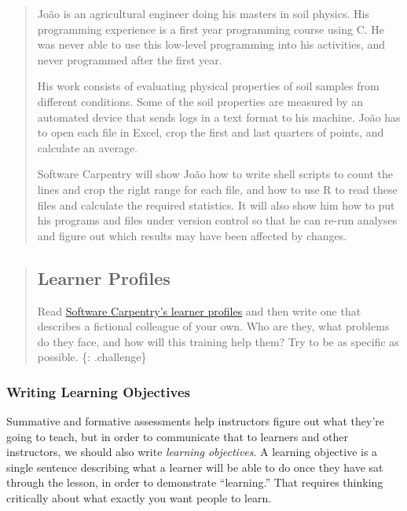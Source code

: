 \begin{quote}
João is an agricultural engineer doing his masters in soil physics. His
programming experience is a first year programming course using C. He
was never able to use this low-level programming into his activities,
and never programmed after the first year.

His work consists of evaluating physical properties of soil samples from
different conditions. Some of the soil properties are measured by an
automated device that sends logs in a text format to his machine. João
has to open each file in Excel, crop the first and last quarters of
points, and calculate an average.

Software Carpentry will show João how to write shell scripts to count
the lines and crop the right range for each file, and how to use R to
read these files and calculate the required statistics. It will also
show him how to put his programs and files under version control so that
he can re-run analyses and figure out which results may have been
affected by changes.
\end{quote}

\begin{quote}
\subsection{Learner Profiles}\label{learner-profiles-1}

Read \href{\{\{\%20site.swc\_site\%20\}\}/audience/}{Software Carpentry's
learner profiles} and then write one that describes a fictional
colleague of your own. Who are they, what problems do they face, and how
will this training help them? Try to be as specific as possible. \{:
.challenge\}
\end{quote}

\subsubsection{Writing Learning
Objectives}\label{writing-learning-objectives}

Summative and formative assessments help instructors figure out what
they're going to teach, but in order to communicate that to learners and
other instructors, we should also write \emph{learning objectives}. A
learning objective is a single sentence describing what a learner will
be able to do once they have sat through the lesson, in order to
demonstrate ``learning.'' That requires thinking critically about what
exactly you want people to learn.

